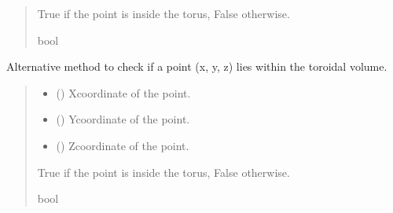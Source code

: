 \documentclass[letterpaper,10pt,english]{sphinxmanual}
\begin{document}
\begin{fulllineitems}
\begin{fulllineitems}
\begin{quote}
\begin{description}
\begin{itemize}
\end{itemize}

\sphinxAtStartPar
True if the point is inside the torus, False otherwise.

\sphinxAtStartPar
bool

\end{description}\end{quote}

\end{fulllineitems}


\begin{fulllineitems}
\label{\detokenize{src:src.Torus.Torus.contains_point2}}
\pysigstartsignatures
{}
\pysigstopsignatures
\sphinxAtStartPar
Alternative method to check if a point (x, y, z) lies within the toroidal volume.
\begin{quote}\begin{description}
\begin{itemize}
\item {} 
\sphinxAtStartPar
{} () \textendash{} X\sphinxhyphen{}coordinate of the point.

\item {} 
\sphinxAtStartPar
{} () \textendash{} Y\sphinxhyphen{}coordinate of the point.

\item {} 
\sphinxAtStartPar
{} () \textendash{} Z\sphinxhyphen{}coordinate of the point.

\end{itemize}

\sphinxAtStartPar
True if the point is inside the torus, False otherwise.

\sphinxAtStartPar
bool


\end{description}
\end{quote}
\end{fulllineitems}
\end{fulllineitems}
\end{document}
